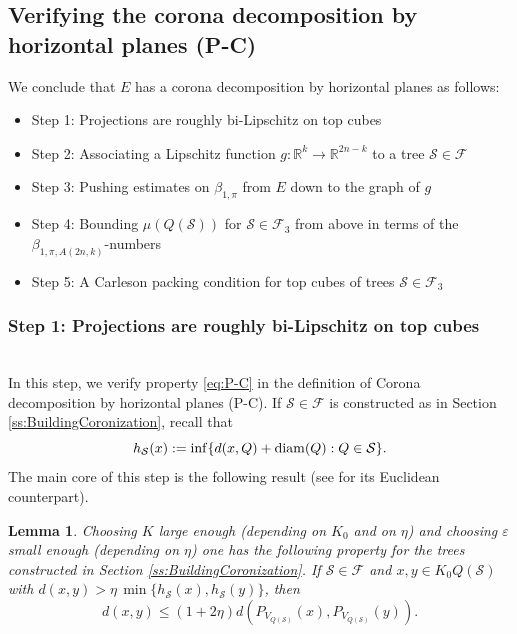 \documentclass[12pt]{amsart}
\newcommand{\diam}{{\rm diam}}
\numberwithin{equation}{section}
\theoremstyle{plain}
\newtheorem{lemma}[theorem]{Lemma}
\theoremstyle{definition}
\theoremstyle{remark}
\begin{document}
\subsection{Verifying the corona decomposition by horizontal planes (P-C)}\label{ss:VerifP-C}

We conclude that $E$ has a corona decomposition by horizontal planes as follows:
\begin{itemize}
    \item[\ref{sss:Step1}] Step 1: Projections are roughly bi-Lipschitz on top cubes
    \item[\ref{sss:Step 2}] Step 2: Associating a Lipschitz function $g:\mathbb{R}^k \to \mathbb{R}^{2n-k}$ to a tree $\mathcal{S}\in \mathcal{F}$
   \item[\ref{ss:Step3}] Step 3: Pushing estimates on $\beta_{1,\pi}$ from $E$ down to the graph of $g$
   \item[\ref{sss:Step4}] Step 4: Bounding $\mu(Q(\mathcal{S}))$ for $\mathcal{S}\in \mathcal{F}_3$ from above in terms of the $\beta_{1,\pi,A(2n,k)}$-numbers
   \item[\ref{sss:Step5}]Step 5: %
   A Carleson packing condition for top cubes of trees $\mathcal S\in \mathcal F_3$
\end{itemize}

\subsubsection{Step 1: Projections are roughly bi-Lipschitz on top cubes}\label{sss:Step1}\phantom{}\vspace{0.1cm}\\
In this step, we verify property \eqref{eq:P-C} in the definition of Corona decomposition by horizontal planes (P-C). If $\mathcal S\in\mathcal F$ is constructed as in Section \ref{ss:BuildingCoronization}, recall that
\begin{equation}\label{maph}h_\mathcal S(x):=\inf\{d(x,Q)+\diam(Q):Q\in\mathcal S\}.\end{equation}
The main core of this step is the following result (see \cite[Lemma 8.4]{David1} for its Euclidean counterpart).
\begin{lemma}\label{l:HahlLem4.3} Choosing $K$ large enough (depending on $K_0$ and on $\eta$) and choosing $\varepsilon$ small enough (depending on $\eta$) one has the following property for the trees constructed in Section \ref{ss:BuildingCoronization}.
If $\mathcal{S}\in \mathcal{F}$ and $x,y\in K_0 Q(\mathcal{S})$ with $d(x,y)>\eta\, \min\{h_{\mathcal{S}}(x),h_{\mathcal{S}}(y)\}$, then 
\begin{displaymath}
d(x,y)\leq (1+2\eta) d(P_{V_{Q(\mathcal{S})}}(x),P_{V_{Q(\mathcal{S})}}(y)).
\end{displaymath}
\end{lemma}
\end{document}
